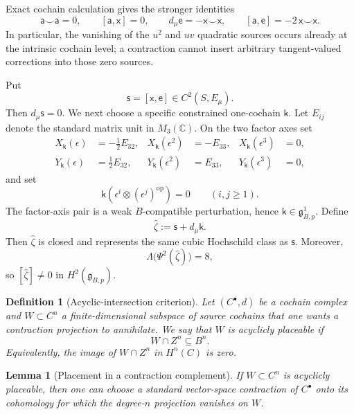 \documentclass[11pt]{amsart}
\newtheorem{lemma}[theorem]{Lemma}
\newtheorem{definition}[theorem]{Definition}
\newcommand{\C}{\mathbb C}
\newcommand{\ghoch}{\mathfrak g}
\begin{document}
Exact cochain calculation gives the stronger identities
\begin{equation}\label{eq:intrinsic-low-identities}
\mathsf a\smile\mathsf a=0,
\qquad
[\mathsf a,\mathsf x]=0,
\qquad
 d_\mu\mathsf e=-\mathsf x\smile\mathsf x,
\qquad
[\mathsf a,\mathsf e]=-2\,\mathsf x\smile\mathsf x.
\end{equation}
In particular, the vanishing of the $u^2$ and $uv$ quadratic sources occurs already at the intrinsic cochain level; a contraction cannot insert arbitrary tangent-valued corrections into those zero sources.

Put
\[
\mathsf s=[\mathsf x,\mathsf e]\in C^2(S,E_\mu).
\]
Then $d_\mu\mathsf s=0$.  We next choose a specific constrained one-cochain $\mathsf k$.
Let $E_{ij}$ denote the standard matrix unit in $M_3(\C)$.  On the two factor axes set
\begin{align*}
X_{\mathsf k}(\epsilon)&=-\tfrac12E_{32},
&X_{\mathsf k}(\epsilon^2)&=-E_{33},
&X_{\mathsf k}(\epsilon^3)&=0,\\
Y_{\mathsf k}(\epsilon)&=\tfrac12E_{32},
&Y_{\mathsf k}(\epsilon^2)&=E_{33},
&Y_{\mathsf k}(\epsilon^3)&=0,
\end{align*}
and set
\[
\mathsf k(\epsilon^i\otimes(\epsilon^j)^{\mathrm{op}})=0
\qquad(i,j\ge1).
\]
The factor-axis pair is a weak $B$-compatible perturbation, hence
$\mathsf k\in\ghoch^1_{B,p}$.
Define
\[
\widehat\zeta:=\mathsf s+d_\mu\mathsf k.
\]
Then $\widehat\zeta$ is closed and represents the same cubic Hochschild class as
$\mathsf s$.  Moreover,
\begin{equation}\label{eq:intrinsic-zeta-projection}
\Lambda\bigl(\Psi^2(\widehat\zeta)\bigr)=8,
\end{equation}
so $[\widehat\zeta]\ne0$ in $H^2(\ghoch_{B,p})$.

\begin{definition}[Acyclic-intersection criterion]\label{def:acyclic-intersection}
Let $(C^\bullet,d)$ be a cochain complex and $W\subset C^n$ a finite-dimensional subspace of source cochains that one wants a contraction projection to annihilate.  We say that $W$ is \emph{acyclicly placeable} if
\[
W\cap Z^n\subseteq B^n.
\]
Equivalently, the image of $W\cap Z^n$ in $H^n(C)$ is zero.
\end{definition}

\begin{lemma}[Placement in a contraction complement]\label{lem:acyclic-placement}
If $W\subset C^n$ is acyclicly placeable, then one can choose a standard vector-space contraction of $C^\bullet$ onto its cohomology for which the degree-$n$ projection vanishes on $W$.
\end{lemma}
\end{document}
